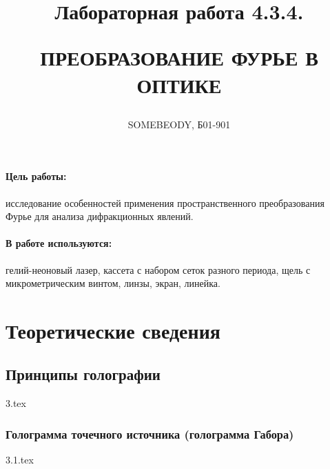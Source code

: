 \documentclass[a5paper,10pt, twoside]{article} %
\title
{
\hfill \break	\hfill \break
\hfill \break	\hfill \break
Лабораторная работа 4.3.4.

ПРЕОБРАЗОВАНИЕ ФУРЬЕ В ОПТИКЕ
}
\author{SOMEBEODY, Б01-901}
\begin{document}
\maketitle


\thispagestyle{empty} %

\newpage

\tableofcontents %

\newpage


\paragraph{Цель работы:}

исследование особенностей применения пространственного преобразования Фурье
для анализа дифракционных явлений.


\paragraph{В работе используются:}

гелий-неоновый лазер, кассета с набором
сеток разного периода, щель с микрометрическим винтом, линзы,
экран, линейка.

\section{Теоретические сведения}

  \subsection{Принципы голографии}
  {3.tex}

    \subsubsection{Голограмма точечного источника (голограмма Габора)}
    {3.1.tex}
\end{document}
